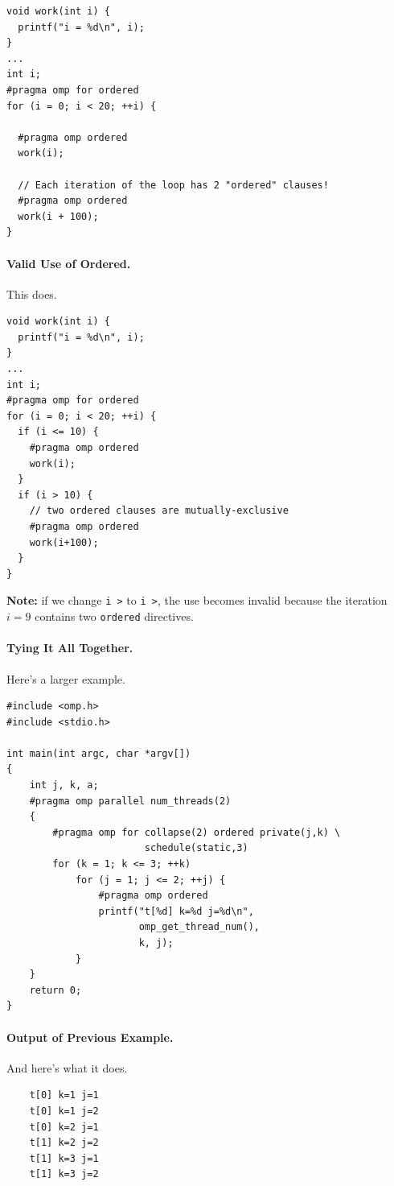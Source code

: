 \documentclass[a4paper]{report}
\begin{document}
{\small
  \begin{lstlisting}
void work(int i) {
  printf("i = %d\n", i);
}
...
int i;
#pragma omp for ordered
for (i = 0; i < 20; ++i) {

  #pragma omp ordered
  work(i);

  // Each iteration of the loop has 2 "ordered" clauses!
  #pragma omp ordered 
  work(i + 100);
}
  \end{lstlisting}
}

\paragraph{Valid Use of Ordered.} This does.
{\small  \begin{lstlisting}
void work(int i) {
  printf("i = %d\n", i);
}
...
int i;
#pragma omp for ordered
for (i = 0; i < 20; ++i) {
  if (i <= 10) {
    #pragma omp ordered
    work(i);
  }
  if (i > 10) {
    // two ordered clauses are mutually-exclusive
    #pragma omp ordered
    work(i+100);
  }
}
  \end{lstlisting}
}

{\bf Note:} if we change {\tt i \textgreater{}} to {\tt i \textgreater{}}, 
the use becomes invalid because the iteration $i=9$ contains two {\tt ordered}
directives.

  \paragraph{Tying It All Together.} Here's a larger example.

  \begin{lstlisting}
#include <omp.h>
#include <stdio.h>

int main(int argc, char *argv[])
{
    int j, k, a;
    #pragma omp parallel num_threads(2)
    {
        #pragma omp for collapse(2) ordered private(j,k) \
                        schedule(static,3)
        for (k = 1; k <= 3; ++k)
            for (j = 1; j <= 2; ++j) {
                #pragma omp ordered
                printf("t[%d] k=%d j=%d\n",
                       omp_get_thread_num(),
                       k, j);
            }
    }
    return 0;
}
  \end{lstlisting}

\paragraph{Output of Previous Example.} And here's what it does.

{\small
  \begin{lstlisting}
    t[0] k=1 j=1
    t[0] k=1 j=2
    t[0] k=2 j=1
    t[1] k=2 j=2
    t[1] k=3 j=1
    t[1] k=3 j=2
  \end{lstlisting}
}
\end{document}
